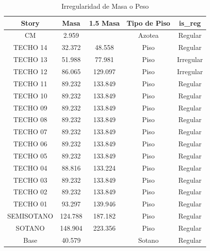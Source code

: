 \documentclass{article}%
\begin{document}
\begin{table}[H]%
\centering%
\caption{Irregularidad de Masa o Peso}%
\begin{tabular}{ccccc}
\toprule
Story & Masa & 1.5 Masa & Tipo de Piso & is\_reg \\
\midrule
CM & 2.959 &  & Azotea & Regular \\
TECHO 14 & 32.372 & 48.558 & Piso & Regular \\
TECHO 13 & 51.988 & 77.981 & Piso & Irregular \\
TECHO 12 & 86.065 & 129.097 & Piso & Irregular \\
TECHO 11 & 89.232 & 133.849 & Piso & Regular \\
TECHO 10 & 89.232 & 133.849 & Piso & Regular \\
TECHO 09 & 89.232 & 133.849 & Piso & Regular \\
TECHO 08 & 89.232 & 133.849 & Piso & Regular \\
TECHO 07 & 89.232 & 133.849 & Piso & Regular \\
TECHO 06 & 89.232 & 133.849 & Piso & Regular \\
TECHO 05 & 89.232 & 133.849 & Piso & Regular \\
TECHO 04 & 88.816 & 133.224 & Piso & Regular \\
TECHO 03 & 89.232 & 133.849 & Piso & Regular \\
TECHO 02 & 89.232 & 133.849 & Piso & Regular \\
TECHO 01 & 93.297 & 139.946 & Piso & Regular \\
SEMISOTANO & 124.788 & 187.182 & Piso & Regular \\
SOTANO & 148.904 & 223.356 & Piso & Regular \\
Base & 40.579 &  & Sotano & Regular \\
\bottomrule
\end{tabular}
%
\end{table}

%
\end{document}

